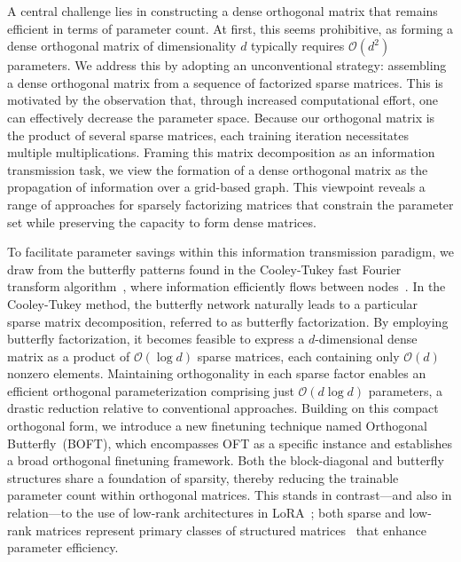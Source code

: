 A central challenge lies in constructing a dense orthogonal matrix that remains efficient in terms of parameter count. At first, this seems prohibitive, as forming a dense orthogonal matrix of dimensionality $d$ typically requires $\mathcal{O}(d^2)$ parameters. We address this by adopting an unconventional strategy: assembling a dense orthogonal matrix from a sequence of factorized sparse matrices. This is motivated by the observation that, through increased computational effort, one can effectively decrease the parameter space. Because our orthogonal matrix is the product of several sparse matrices, each training iteration necessitates multiple multiplications. Framing this matrix decomposition as an information transmission task, we view the formation of a dense orthogonal matrix as the propagation of information over a grid-based graph. This viewpoint reveals a range of approaches for sparsely factorizing matrices that constrain the parameter set while preserving the capacity to form dense matrices.

To facilitate parameter savings within this information transmission paradigm, we draw from the butterfly patterns found in the Cooley-Tukey fast Fourier transform algorithm~\cite{cooley1965algorithm}, where information efficiently flows between nodes~\cite{klasing1994broadcasting}. In the Cooley-Tukey method, the butterfly network naturally leads to a particular sparse matrix decomposition, referred to as butterfly factorization. By employing butterfly factorization, it becomes feasible to express a $d$-dimensional dense matrix as a product of $\mathcal{O}(\log d)$ sparse matrices, each containing only $\mathcal{O}(d)$ nonzero elements. Maintaining orthogonality in each sparse factor enables an efficient orthogonal parameterization comprising just $\mathcal{O}(d\log d)$ parameters, a drastic reduction relative to conventional approaches. Building on this compact orthogonal form, we introduce a new finetuning technique named Orthogonal Butterfly~(BOFT), which encompasses OFT as a specific instance and establishes a broad orthogonal finetuning framework. Both the block-diagonal and butterfly structures share a foundation of sparsity, thereby reducing the trainable parameter count within orthogonal matrices. This stands in contrast—and also in relation—to the use of low-rank architectures in LoRA~\cite{hulora2022}; both sparse and low-rank matrices represent primary classes of structured matrices~\cite{candes2011robust} that enhance parameter efficiency.

